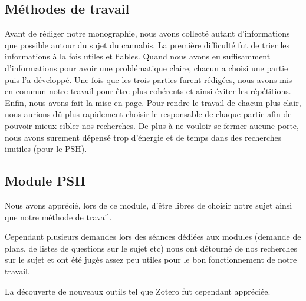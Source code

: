 \subsection*{Méthodes de travail}
Avant de rédiger notre monographie, nous avons collecté autant d’informations que possible autour du sujet du cannabis. La première difficulté fut de trier les informations à la fois utiles et fiables. Quand nous avons eu suffisamment d’informations pour avoir une problématique claire, chacun a choisi une partie puis l’a développé. Une fois que les trois parties furent rédigées, nous avons mis en commun notre travail pour être plus cohérents et ainsi éviter les répétitions. Enfin, nous avons fait la mise en page. Pour rendre le travail de chacun plus clair, nous aurions dû plus rapidement choisir le responsable de chaque partie afin de pouvoir mieux cibler nos recherches. De plus à ne vouloir se fermer aucune porte, nous avons surement dépensé trop d’énergie et de temps dans des recherches inutiles (pour le PSH).


\subsection*{Module PSH}

Nous avons apprécié, lors de ce module, d’être libres de choisir notre sujet ainsi que notre méthode de travail.

Cependant plusieurs demandes lors des séances dédiées aux modules (demande de plans, de listes de questions sur le sujet etc) nous ont détourné de nos recherches sur le sujet et ont été jugés assez peu utiles pour le bon fonctionnement de notre travail.

La découverte de nouveaux outils tel que Zotero fut cependant appréciée.







